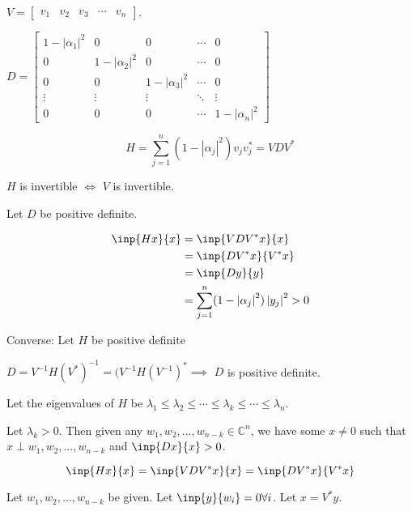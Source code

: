 \documentclass[twofold]{article}
\newcommand*\adj[1]{#1^*}
\newcommand*\abs[1]{\left \vert #1 \right\vert}
\theoremstyle{plain}
\theoremstyle{definition}
\theoremstyle{remark}
\begin{document}

\(V = \begin{bmatrix} v_1 & v_2 & v_3 & \cdots & v_n \end{bmatrix} \). 

\(D = \begin{bmatrix} 1 - \abs{\alpha_1}^2 & 0 & 0 & \cdots & 0 \\
0 & 1 - \abs{\alpha_2}^2 & 0 & \cdots & 0 \\
0 & 0 & 1- \abs{\alpha_3}^2 & \cdots & 0 \\
\vdots & \vdots & \vdots & \ddots& \vdots \\
0 & 0 & 0 & \cdots & 1 - \abs{\alpha_n}^2 \end{bmatrix}\)


\[H = \sum_{j = 1} ^n (1 - \abs{\alpha_j}^2) v_j \adj{v_j} = V D \adj{V}\]

\(H\) is invertible \(\iff\) \(V\) is invertible. 

Let \(D\) be positive definite. 

\begin{equation*}\begin{split}
\inp{Hx}{x} & = \inp{VD\adj{V} x}{x} \\
& = \inp{D\adj{V} x}{\adj{V}x} \\
& = \inp{Dy}{y} \\
& = \sum_{j =1}^n (1 - \abs{\alpha_j}^2) \abs{y_j}^2 > 0
\end{split} \end{equation*}


Converse: Let \(H\) be positive definite

\(D = V^{-1} H (\adj{V}) ^{-1} = (V^{-1} H \adj{(V^{-1})} \implies \) \(D\) is positive definite.



Let the eigenvalues of \(H\) be \(\lambda_1 \le \lambda_2 \le \cdots \le \lambda_k \le \cdots \le \lambda_n\).

Let \(\lambda_k > 0\). Then given any \(w_1, w_2, \ldots , w_{n-k} \in \mathbb{C}^n\), we have some \(x \ne 0\) such that \(x \perp w_1, w_2 , \ldots , w_{n-k}\) and \(\inp{Dx}{x} > 0\).

\[\inp{Hx}{x} = \inp{VD\adj{V} x}{x} = \inp{D\adj{V} x}{\adj{V}x}\]

Let \(w_1, w_2, \ldots , w_{n-k}\) be given. Let \(\inp{y}{w_i} = 0 \forall i\). Let \(x = \adj{V}y\). 
\end{document}
